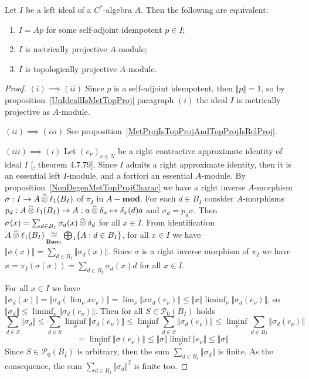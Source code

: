 \begin{theorem}\label{LeftIdealOfCStarAlgMetTopProjCharac} Let $I$ be a left
ideal of a $C^*$-algebra $A$. Then the following are equivalent:

\begin{enumerate}[label = (\roman*)]
    \item $I=Ap$ for some self-adjoint idempotent $p\in I$;

    \item $I$ is metrically projective $A$-module;

    \item $I$ is topologically projective $A$-module.
\end{enumerate}
\end{theorem}
\begin{proof} $(i)\implies (ii)$ Since $p$ is a self-adjoint idempotent, then
$\Vert p\Vert=1$, so by proposition~\ref{UnIdeallIsMetTopProj} paragraph $(i)$
the ideal $I$ is metrically projective as $A$-module.

$(ii)\implies (iii)$ See
proposition~\ref{MetProjIsTopProjAndTopProjIsRelProj}.

$(iii) \implies (i)$ Let ${(e_\nu)}_{\nu\in N}$ be a right contractive
approximate identity of ideal $I$ [\cite{HelBanLocConvAlg}, theorem 4.7.79].
Since $I$ admits a right approximate identity, then it is an essential left
$I$-module, and a fortiori an essential $A$-module. By
proposition~\ref{NonDegenMetTopProjCharac} we have a right inverse $A$-morphism
$\sigma:I\to A\mathbin{\widehat{\otimes}} \ell_1(B_I)$ of $\pi_I$ in $A-\mathbf{mod}$. For each
$d\in B_I$ consider $A$-morphisms $p_d:A\mathbin{\widehat{\otimes}} \ell_1(B_I)\to A:a\mathbin{\widehat{\otimes}}
\delta_x\mapsto \delta_x(d)a$ and $\sigma_d=p_d\sigma$. Then
$\sigma(x)=\sum_{d\in B_I}\sigma_d(x)\mathbin{\widehat{\otimes}} \delta_d$ for all $x\in I$. From
identification 
$A\mathbin{\widehat{\otimes}}\ell_1(B_I)\mathop{\mathbin{\cong}}\limits_{\mathbf{Ban}_1}\bigoplus_1 \{ A:d\in B_I \}$, 
for all $x\in I$ we 
have $\Vert\sigma(x)\Vert=\sum_{d\in B_I} \Vert\sigma_d(x)\Vert$. 
Since $\sigma$ is a right inverse morphism of $\pi_I$ we
have $x=\pi_I(\sigma(x))=\sum_{d\in B_I}\sigma_d(x)d$ for all $x\in I$. 

For all $x\in I$ we have 
$\Vert\sigma_d(x)\Vert
=\Vert\sigma_d(\lim_\nu xe_\nu)\Vert
=\lim_\nu\Vert x\sigma_d(e_\nu)\Vert 
\leq\Vert x\Vert\liminf_\nu\Vert\sigma_d(e_\nu)\Vert$, 
so $\Vert\sigma_d\Vert\leq \liminf_\nu\Vert\sigma_d(e_\nu)\Vert$. 
Then for all $S\in\mathcal{P}_0(B_I)$ holds
$$
\sum_{d\in S}\Vert \sigma_d\Vert
\leq \sum_{d\in S}\liminf_\nu\Vert \sigma_d(e_\nu)\Vert
\leq \liminf_\nu\sum_{d\in S}\Vert \sigma_d(e_\nu)\Vert
\leq \liminf_\nu\sum_{d\in B_I}\Vert \sigma_d(e_\nu) \Vert
$$
$$
=\liminf_{\nu}\Vert\sigma(e_\nu)\Vert
\leq \Vert\sigma\Vert\liminf_{\nu}\Vert e_\nu\Vert
\leq \Vert\sigma\Vert
$$
Since $S\in \mathcal{P}_0(B_I)$ is arbitrary, then the sum 
$\sum_{d\in B_I}\Vert\sigma_d\Vert$ is finite. As the consequence, the 
sum $\sum_{d\in B_I}\Vert\sigma_d\Vert^2$ is finite too. 


\end{proof}
